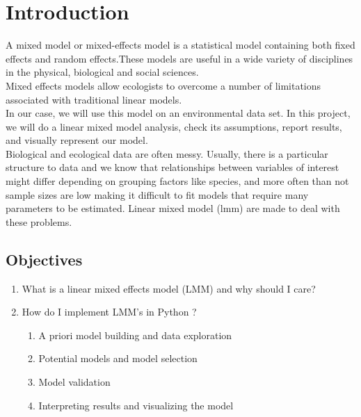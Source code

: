 \documentclass{article}
\begin{document}
\sloppy
{}


\section{Introduction}
\label{sec:introduction}

A mixed model or mixed-effects model is a statistical model containing both fixed effects and random effects.These models are useful in a wide variety of disciplines in the physical, biological and social sciences. \\
Mixed effects models allow ecologists to overcome a number of limitations associated with traditional linear models.\\
In our case, we will use this model on an environmental data set. In this project, we will do a linear mixed model analysis, check its assumptions, report results, and visually represent our model.\\

Biological and ecological data are often messy. Usually, there is a particular structure to data and we know that relationships between variables of interest might differ depending on grouping factors like species, and more often than not sample sizes are low making it difficult to fit models that require many parameters to be estimated. Linear mixed model (lmm) are made to deal with these problems.

\subsection{Objectives}
\begin{enumerate}
    \item What is a linear mixed effects model (LMM) and why should I care?
    \item How do I implement LMM's in Python ?
    \begin{enumerate}
        \item A priori model building and data exploration
        \item Potential models and model selection
        \item Model validation
        \item Interpreting results and visualizing the model
    \end{enumerate}
\end{enumerate}
\end{document}
